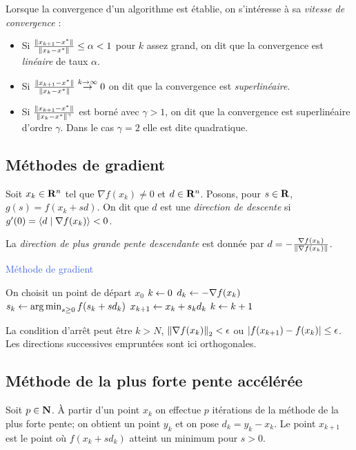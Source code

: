 	Lorsque la convergence d'un algorithme est établie, on s'intéresse à sa \emph{vitesse de convergence} :
	\begin{itemize}
		\item[\textbullet] Si $\frac{\left\lVert x_{k + 1} - x^*\right\rVert}{\left\lVert x_k - x^*\right\rVert} \leq \alpha < 1$ pour $k$ assez grand, on dit que la convergence est \emph{linéaire} de taux $\alpha$.
		\item[\textbullet] Si $\frac{\left\lVert x_{k + 1} - x^*\right\rVert}{\left\lVert x_k - x^*\right\rVert} \overset{k \to \infty}{\to} 0$ on dit que la convergence est \emph{superlinéaire}.
		\item[\textbullet] Si $\frac{\left\lVert x_{k + 1} - x^*\right\rVert}{\left\lVert x_k - x^*\right\rVert^\gamma}$ est borné avec $\gamma > 1$, on dit que la convergence est superlinéaire d'ordre $\gamma$. Dans le cas $\gamma = 2$ elle est dite quadratique.
	\end{itemize}


\subsection{Méthodes de gradient}

	Soit $x_k \in \mathbf{R}^n$ tel que $\nabla f(x_k) \neq 0$ et $d \in \mathbf{R}^n$.
	Posons, pour $s \in \mathbf{R}$, $g(s) = f(x_k + sd)$.
	On dit que $d$ est une \emph{direction de descente} si $g'(0) = \left\langle d \mid \nabla f(x_k) \right\rangle < 0$.

	La \emph{direction de plus grande pente descendante} est donnée par $d = - \frac{\nabla f(x_k)}{\left\lVert\nabla f(x_k)\right\rVert}$.
	
	\begin{algorithm}[h]
		\caption{\textcolor{RoyalBlue}{Méthode de gradient}}
		On choisit un point de départ $x_0$ \;
		$k \leftarrow 0$ \;
		{
			$d_k \leftarrow - \nabla f(x_k)$ \;
			$s_k \leftarrow \operatorname{arg\, min}_{s \geq 0} f(s_k + s d_k)$ \;
			$x_{k + 1} \leftarrow x_k + s_k d_k$ \;
			$k \leftarrow k + 1$ \;
		}
	\end{algorithm}

	La condition d'arrêt peut être $k > N$, $\left\lVert\nabla f(x_k)\right\rVert_2 < \epsilon$ ou $\left\lvert f(x_{k + 1}) - f(x_k)\right\rvert \leq \epsilon$.
	Les directions successives empruntées sont ici orthogonales.


\subsection{Méthode de la plus forte pente accélérée}

	Soit $p \in \mathbf{N}$.
	À partir d'un point $x_k$ on effectue $p$ itérations de la méthode de la plus forte pente; on obtient un point $y_k$ et on pose $d_k = y_k - x_k$.
	Le point $x_{k + 1}$ est le point où $f(x_k + s d_k)$ atteint un minimum pour $s > 0$.
